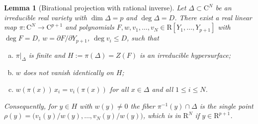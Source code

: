 \documentclass[10pt]{amsart}
\newtheorem{lemma}{Lemma}[section]
\theoremstyle{definition}
\theoremstyle{remark}
\numberwithin{equation}{section}
\newcommand {\R} {\mathrm{R}}
\newcommand {\C}     {\mathrm{C}}
\begin{document}
\begin{lemma}[Birational projection with rational inverse]
\label{lem:K}
Let $\Delta\subset\C^N$ be an irreducible real variety with $\dim\Delta=p$ and $\deg\Delta=D$. There exist a real linear map $\pi:\C^N\to\C^{p+1}$ and polynomials $F,w,v_1,\dots,v_N\in\R[Y_1,\dots,Y_{p+1}]$ with $\deg F=D$, $w=\partial F/\partial Y_{p+1}$, $\deg v_i\le D$, such that
\begin{enumerate}[(a)]
\item
\label{itemlabel:lem:K:a}
$\pi|_\Delta$ is finite and $H:=\pi(\Delta)=Z(F)$ is an irreducible hypersurface;
\item 
\label{itemlabel:lem:K:b}
$w$ does not vanish identically on $H$;
\item 
\label{itemlabel:lem:K:c}
$w(\pi(x))\,x_i=v_i(\pi(x))$ for all $x\in\Delta$ and all $1\le i\le N$.
\end{enumerate}
Consequently, for $y\in H$ with $w(y)\ne0$ the fiber $\pi^{-1}(y)\cap\Delta$ is the single point $\rho(y)=\bigl(v_1(y)/w(y),\dots,v_N(y)/w(y)\bigr)$, which is in $\R^{N}$  if $y \in \R^{p+1}$. 
\end{lemma}
\end{document}
